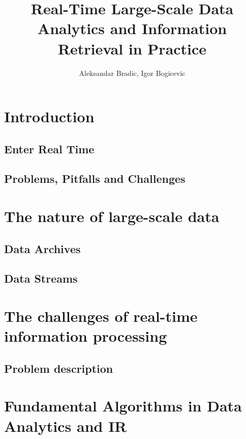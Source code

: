 \documentclass[]{book}    %
\begin{document}
\author{Aleksandar Bradic, Igor Bogicevic}
\date{}
\title{Real-Time Large-Scale Data Analytics and Information Retrieval in Practice}

\maketitle 

  \frontmatter 
  \tableofcontents 


\mainmatter 

\chapter{Introduction}
\label{altrings} %

\section{Enter Real Time}
\section{Problems, Pitfalls and Challenges}

\chapter{The nature of large-scale data}
\section{Data Archives}
\section{Data Streams}

\chapter{The challenges of real-time information processing}
\section{Problem description}

\chapter{Fundamental Algorithms in Data Analytics and IR}
\end{document}
